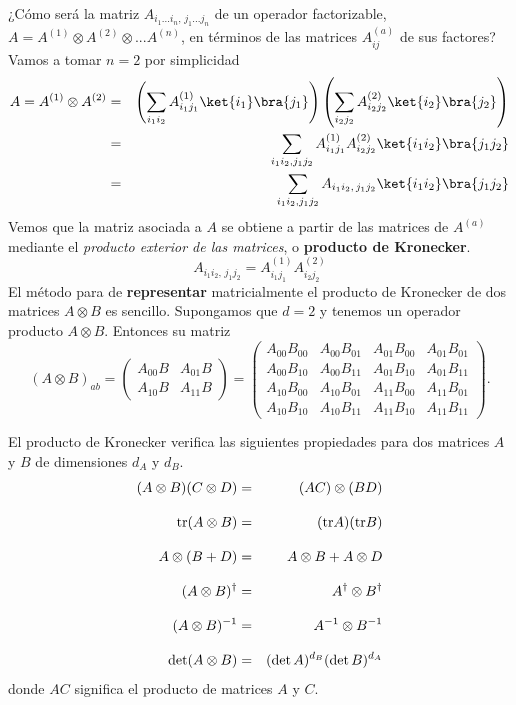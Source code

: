 \documentclass[a4paper,11pt]{book} %
\numberwithin{equation}{chapter}
\begin{document}
¿Cómo será la matriz $A_{i_1...i_n, \, j_1...j_n}$ de un operador factorizable, $ A = A^{(1)}\otimes A^{(2)} \otimes ...A^{(n)}$, en términos de las matrices  $ A^{(a)}_{ij}$ de sus factores? Vamos a tomar  $n=2$ por simplicidad
\begin{eqnarray}
A = A^{(1)}\otimes  A^{(2)} &=&\left( \sum_{i_1i_2}A^{(1)}_{i_1 j_1} \ket{i_1}\bra{j_1}\right)\left( \sum_{i_2j_2}A^{(2)}_{i_2 j_2} \ket{i_2}\bra{j_2}\right)\\
&=& \sum_{i_1 i_2 , j_1 j_2} A^{(1)}_{i_1 j_1}A^{(2)}_{i_2 j_2}\ket{i_1 i_2}\bra{j_1j_2} \\
&=& \sum_{i_1 i_2 , j_1 j_2} A_{i_1i_2,\, j_1j_2}\ket{i_1 i_2}\bra{j_1j_2}
\end{eqnarray}
Vemos que la matriz asociada a $A$ se obtiene  a partir de las matrices de $A^{(a)}$ mediante el  \textit{producto exterior de las matrices}, o \textbf{producto de Kronecker}.
	\begin{equation}
	  A_{i_1i_2,\,j_1j_2} = A^{(1)}_{i_1j_1}A^{(2)}_{i_2 j_2} 
	\end{equation}
El método para de \textbf{representar} matricialmente el producto de Kronecker de dos matrices $A\otimes B$ es sencillo. Supongamos que $d=2$ y tenemos un operador producto $A\otimes B$. Entonces su matriz 
	\begin{equation}
(A\otimes B)_{ab} = \begin{pmatrix} A_{00}B & A_{01}B \\ A_{10}B & A_{11}B \end{pmatrix} = \begin{pmatrix} A_{00}B_{00} & A_{00}B_{01} & A_{01}B_{00} & A_{01}B_{01} \\
                A_{00}B_{10} & A_{00}B_{11} & A_{01}B_{10} & A_{01}B_{11} \\
                A_{10}B_{00} & A_{10}B_{01} & A_{11}B_{00} & A_{11}B_{01} \\
                A_{10}B_{10} & A_{10}B_{11} & A_{11}B_{10} & A_{11}B_{11} \end{pmatrix}.
	\end{equation}

El producto de Kronecker verifica las siguientes propiedades para dos matrices $A$  y $B$ de dimensiones $d_A$ y $d_B$. 
\begin{eqnarray}
(A\otimes B)(C\otimes D) &=& (AC)\otimes (BD) \nonumber\\ \rule{0mm}{6mm}
{\rm tr}(A\otimes B) &=& ({\rm tr} A)({\rm tr} B) \nonumber\\ \rule{0mm}{6mm}
A\otimes(B+D) &=& A\otimes B + A\otimes D \nonumber\\ \rule{0mm}{6mm}
(A\otimes B)^\dagger &=& A^\dagger\otimes B^\dagger \nonumber\\ \rule{0mm}{6mm}
(A\otimes B)^{-1} &=& A^{-1} \otimes B^{-1} \nonumber\\ \rule{0mm}{6mm}
\det (A\otimes B) &=& (\det A)^{d_B}(\det B)^{d_A}
\end{eqnarray}
donde $AC$ significa el producto de matrices $A$ y $C$.
\end{document}
